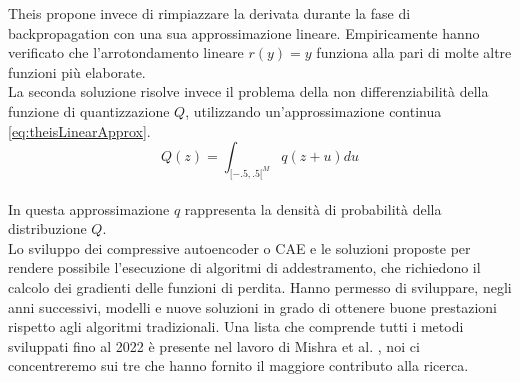 Theis propone invece di rimpiazzare la derivata durante la fase di backpropagation con una sua approssimazione lineare. Empiricamente hanno verificato che l'arrotondamento lineare $r(y)=y$ funziona alla pari di molte altre funzioni più elaborate.\\
La seconda soluzione risolve invece il problema della non differenziabilità della funzione di quantizzazione $Q$, utilizzando un’approssimazione continua \ref{eq:theisLinearApprox}.\\
\begin{equation}\label{eq:theisLinearApprox}
    Q(z) = \int_{[-.5,.5[^{M}} q(z+u) du
\end{equation}\\
In questa approssimazione $q$ rappresenta la densità di probabilità della distribuzione $Q$.\\
Lo sviluppo dei compressive autoencoder o CAE e le soluzioni proposte per rendere possibile l’esecuzione di algoritmi di addestramento, che richiedono il calcolo dei gradienti delle funzioni di perdita. Hanno permesso di sviluppare, negli anni successivi, modelli e nuove soluzioni in grado di ottenere buone prestazioni rispetto agli algoritmi tradizionali. Una lista che comprende tutti i metodi sviluppati fino al 2022 è presente nel lavoro di Mishra et al. \cite{mishra2022deep}, noi ci concentreremo sui tre che hanno fornito il maggiore contributo alla ricerca.


